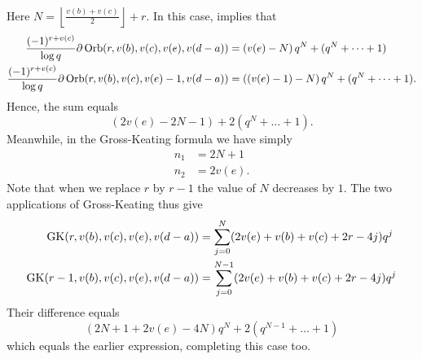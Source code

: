 Here $N = \left\lfloor \tfrac{v(b)+v(c)}{2} \right\rfloor + r$.
In this case,  implies that
\begin{align*}
  \frac{(-1)^{r+v(c)}}{\log q}\partial\operatorname{Orb}(r, v(b), v(c), v(e), v(d-a))
  &= \left( v(e) - N \right) q^{N} + (q^N + \dots + 1) \\
  \frac{(-1)^{r+v(c)}}{\log q}\partial\operatorname{Orb}(r, v(b), v(c), v(e)-1, v(d-a))
  &= \left( (v(e) - 1) - N \right) q^{N} + (q^N + \dots + 1).
\end{align*}
Hence, the sum equals
\[ \left( 2v(e) - 2N - 1 \right) + 2(q^N + \dots + 1). \]
Meanwhile, in the Gross-Keating formula we have simply
\begin{align*}
  n_1 &= 2N+1 \\
  n_2 &= 2v(e).
\end{align*}
Note that when we replace $r$ by $r-1$ the value of $N$ decreases by $1$.
The two applications of Gross-Keating thus give
\begin{align*}
  \operatorname{GK}(r, v(b), v(c), v(e), v(d-a))
  &= \sum_{j=0}^N (2v(e)+v(b)+v(c)+2r-4j) q^j \\
  \operatorname{GK}(r-1, v(b), v(c), v(e), v(d-a))
  &= \sum_{j=0}^{N-1} (2v(e)+v(b)+v(c)+2r-4j) q^j \\
\end{align*}
Their difference equals
\[ (2N+1+2v(e)-4N) q^{N} + 2(q^{N-1} + \dots + 1) \]
which equals the earlier expression, completing this case too.

